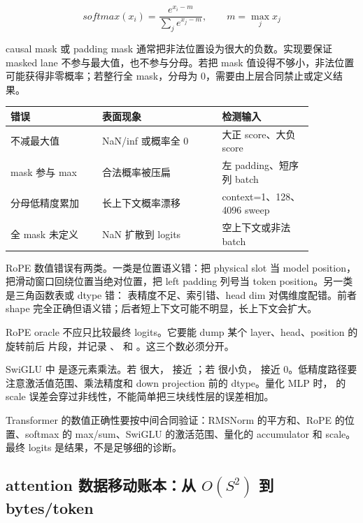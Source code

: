 \[
softmax(x_i)=\frac{e^{x_i-m}}{\sum_j e^{x_j-m}}, \qquad m=\max_j x_j
\]

causal mask 或 padding mask 通常把非法位置设为很大的负数。实现要保证 masked lane 不参与最大值，也不参与分母。若把 mask 值设得不够小，非法位置可能获得非零概率；若整行全 mask，分母为 0，需要由上层合同禁止或定义结果。

\begin{center}
\begin{tabular}{p{0.26\linewidth}p{0.34\linewidth}p{0.26\linewidth}}
\toprule
错误 & 表面现象 & 检测输入 \\
\midrule
不减最大值 & NaN/inf 或概率全 0 & 大正 score、大负 score \\
mask 参与 max & 合法概率被压扁 & 左 padding、短序列 batch \\
分母低精度累加 & 长上下文概率漂移 & context=1、128、4096 sweep \\
全 mask 未定义 & NaN 扩散到 logits & 空上下文或非法 batch \\
\bottomrule
\end{tabular}
\end{center}

RoPE 数值错误有两类。一类是位置语义错：把 physical slot 当 model position，把滑动窗口回绕位置当绝对位置，把 left padding 列号当 token position。另一类是三角函数表或 dtype 错： 表精度不足、索引错、head dim 对偶维度配错。前者 shape 完全正确但语义错；后者短上下文可能不明显，长上下文会扩大。

RoPE oracle 不应只比较最终 logits。它要能 dump 某个 layer、head、position 的旋转前后  片段，并记录 、 和 。这三个数必须分开。

SwiGLU 中  是逐元素乘法。若  很大， 接近 ；若  很小负， 接近 0。低精度路径要注意激活值范围、乘法精度和 down projection 前的 dtype。量化 MLP 时， 的 scale 误差会穿过非线性，不能简单把三块线性层的误差相加。

\begin{keyidea}
Transformer 的数值正确性要按中间合同验证：RMSNorm 的平方和、RoPE 的位置、softmax 的 max/sum、SwiGLU 的激活范围、量化的 accumulator 和 scale。最终 logits 是结果，不是足够细的诊断。
\end{keyidea}

\subsection{attention 数据移动账本：从 \(O(S^2)\) 到 bytes/token}

